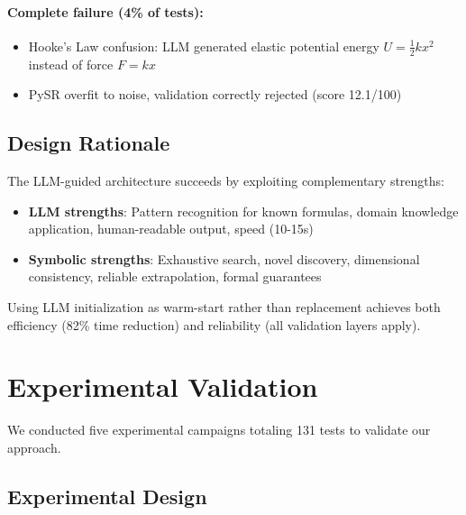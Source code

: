 \documentclass[twoside,11pt]{article}
\begin{document}
\paragraph{Complete failure (4\% of tests):}
\begin{itemize}
\item Hooke's Law confusion: LLM generated elastic potential energy $U = \frac{1}{2}kx^2$ instead of force $F = kx$
\item PySR overfit to noise, validation correctly rejected (score 12.1/100)
\end{itemize}

\subsection{Design Rationale}

The LLM-guided architecture succeeds by exploiting complementary strengths:

\begin{itemize}
\item \textbf{LLM strengths}: Pattern recognition for known formulas, domain knowledge application, human-readable output, speed (10-15s)
\item \textbf{Symbolic strengths}: Exhaustive search, novel discovery, dimensional consistency, reliable extrapolation, formal guarantees
\end{itemize}

Using LLM initialization as warm-start rather than replacement achieves both efficiency (82\% time reduction) and reliability (all validation layers apply).

\section{Experimental Validation}
\label{sec:experiments}

We conducted five experimental campaigns totaling 131 tests to validate our approach.

\subsection{Experimental Design}
\end{document}
